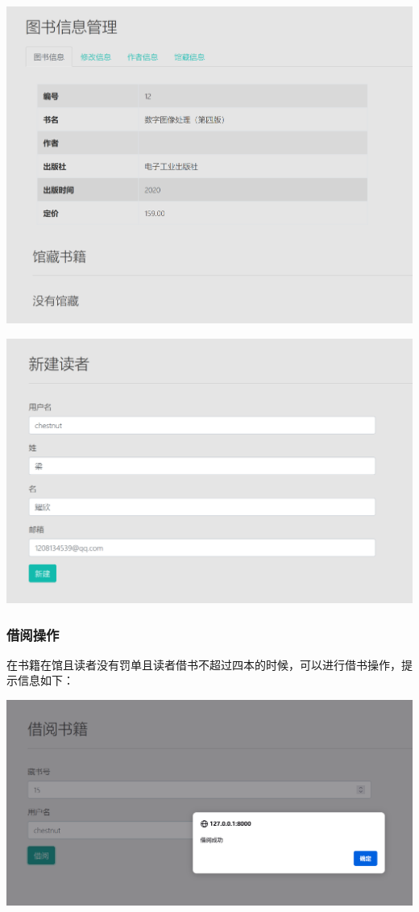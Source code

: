 \documentclass[a4paper,14pt]{article}
\begin{document}
\vspace{10pt}
\begin{center}
    \includegraphics[width=0.7\linewidth]{images/xinjian2.png}\end{center}
\vspace{5pt}


\vspace{10pt}
\begin{center}
    \includegraphics[width=0.7\linewidth]{images/xinjian4.png}\end{center}
\vspace{5pt}


\subsubsection{借阅操作}
在书籍在馆且读者没有罚单且读者借书不超过四本的时候，可以进行借书操作，提示信息如下：

\vspace{10pt}
\begin{center}
    \includegraphics[width=0.7\linewidth]{images/jieyue1.png}\end{center}
\vspace{5pt}
\end{document}
